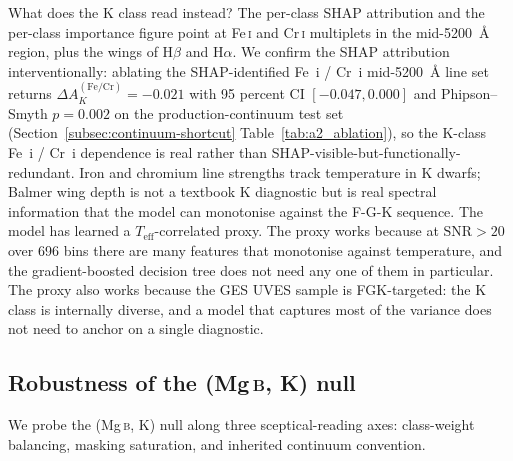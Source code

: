 \documentclass[11pt,a4paper]{article}
\newcommand{\Halpha}{H$\alpha$\xspace}
\newcommand{\Hbeta}{H$\beta$\xspace}
\newcommand{\Mgb}{Mg\,\textsc{b}\xspace}
\newcommand{\FeI}{Fe\,\textsc{i}\xspace}
\newcommand{\CrI}{Cr\,\textsc{i}\xspace}
\newcommand{\Teff}{$T_{\mathrm{eff}}$\xspace}
\newcommand{\dA}{\Delta A}
\begin{document}
What does the K class read instead? The per-class SHAP attribution and the per-class importance figure point at \FeI and \CrI multiplets in the mid-5200~\AA{} region, plus the wings of \Hbeta and \Halpha. We confirm the SHAP attribution interventionally: ablating the SHAP-identified Fe~i / Cr~i mid-5200~\AA{} line set returns $\dA_K^{(\mathrm{Fe}/\mathrm{Cr})} = -0.021$ with 95 percent CI $[-0.047, 0.000]$ and Phipson--Smyth $p = 0.002$ on the production-continuum test set (Section~\ref{subsec:continuum-shortcut} Table~\ref{tab:a2_ablation}), so the K-class Fe~i / Cr~i dependence is real rather than SHAP-visible-but-functionally-redundant. Iron and chromium line strengths track temperature in K dwarfs; Balmer wing depth is not a textbook K diagnostic but is real spectral information that the model can monotonise against the F-G-K sequence. The model has learned a \Teff-correlated proxy. The proxy works because at $\mathrm{SNR} > 20$ over 696 bins there are many features that monotonise against temperature, and the gradient-boosted decision tree does not need any one of them in particular. The proxy also works because the GES UVES sample is FGK-targeted: the K class is internally diverse, and a model that captures most of the variance does not need to anchor on a single diagnostic.

\subsection{\texorpdfstring{Robustness of the (\Mgb, K) null}{Robustness of the (Mg b, K) null}}
\label{subsec:robustness}

We probe the (\Mgb, K) null along three sceptical-reading axes: class-weight balancing, masking saturation, and inherited continuum convention.
\end{document}
